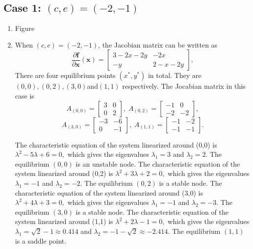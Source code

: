 \documentclass[a4paper,twocolumn]{article} %
\begin{document}
\subsection*{Case 1: $(c,e)=(-2,-1)$}
\begin{enumerate}
\item Figure
\item When $(c,e)=(-2,-1)$, the Jacobian matrix can be written as
\begin{equation*}
    \frac{\partial\textbf{f}}{\partial \textbf{x}}(\textbf{x}) =
    \left[\begin{array}{cc}
    3-2x-2y & -2x \\
    -y & 2-x-2y
    \end{array}\right],
\end{equation*}
There are four equilibrium points $(x^*,y^*)$ in total. They are $(0,0),(0,2),(3,0)$and$(1,1)$ respectively. The Jocabian matrix in this case is
\begin{equation*}
    A_{(0,0)} =
    \left[\begin{array}{cc}
    3 & 0 \\
    0 & 2
    \end{array}\right], \; A_{(0,2)} =
    \left[\begin{array}{cc}
    -1 & 0 \\
    -2 & -2
    \end{array}\right],   
    \end{equation*}
    \begin{equation*}
    A_{(3,0)} =
    \left[\begin{array}{cc}
    -3 & -6 \\
    0 & -1
    \end{array}\right], \;A_{(1,1)} =
    \left[\begin{array}{cc}
    -1 & -2 \\
    -1 & -1
    \end{array}\right].
\end{equation*}

The characteristic equation of the system linearized around \mbox{(0,0)} is $\lambda^2 -5 \lambda + 6 = 0,$ which gives the eigenvalues $\lambda_{1} = 3$ and $\lambda_{2} = 2$. The equilibrium $(0,0)$ is an unstable node. 
The characteristic equation of the system linearized around \mbox{(0,2)} is $\lambda^2 +3 \lambda + 2 = 0,$ which gives the eigenvalues $\lambda_1 = -1$ and $\lambda_2 = -2$. The equilibrium $(0,2)$ is a stable node. 
The characteristic equation of the system linearized around \mbox{(3,0)} is
$\lambda^2 +4 \lambda + 3 = 0,$ which gives the eigenvalues $\lambda_1 = -1$ and $\lambda_2 = -3$. The equilibrium $(3,0)$ is a stable node.
The characteristic equation of the system linearized around \mbox{(1,1)} is $\lambda^2 +2 \lambda - 1 = 0,$ which gives the eigenvalues $\lambda_1 = \sqrt{2} -1 \approx 0.414$ and $\lambda_2 = -1 -\sqrt{2} \approx -2.414$. The equilibrium $(1,1)$ is a saddle point.


\end{enumerate}
\end{document}
